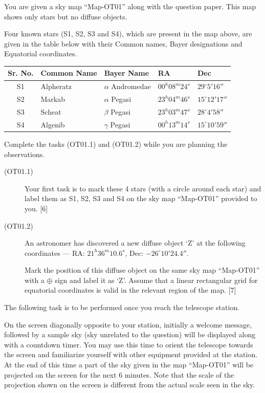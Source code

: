 You are given a sky map ``Map-OT01'' along with the question paper. This map
shows only stars but no diffuse objects.


Four known stars (S1, S2, S3 and S4), which are present in the map above,
are given in the table below with their Common names, Bayer designations and
Equatorial coordinates.

\begin{center}
\begin{tabular}{cllll}
Sr. No. & Common Name & Bayer Name & RA & Dec \\
\hline
S1 & Alpheratz & $\alpha$ Andromedae & $00^h08^m24^s$ & $29^\circ 5'16''$ \\
S2 & Markab & $\alpha$ Pegasi & $23^h04^m46^s$ & $15^\circ 12'17''$ \\
S3 & Scheat & $\beta$ Pegasi & $23^h03^m47^s$ & $28^\circ 4'58''$ \\
S4 & Algenib & $\gamma$ Pegasi & $00^h13^m14^s$ & $15^\circ 10'59''$ \\
\end{tabular}
\end{center}

Complete the tasks (OT01.1) and (OT01.2) while you are planning the
observations.

\begin{description}
\item[(OT01.1)] Your first task is to mark these 4 stars (with a circle
  around each star) and label them as S1, S2, S3 and S4 on the sky map
  ``Map-OT01'' provided to you. \hfill[6]
\item[(OT01.2)] An astronomer has discovered a new diffuse object `Z' at the
  following coordinates ---
  RA: $21^h36^m10.6^s$, Dec: $-26^\circ 10'24.4''$.

  Mark the position of this diffuse object on the same sky map ``Map-OT01''
  with a $\oplus$ sign and label it as `Z'. Assume that a linear rectangular
  grid for equatorial coordinates is valid in the relevant region of the
  map. \hfill[7]
\end{description}

The following task is to be performed once you reach the telescope station.

On the screen diagonally opposite to your station, initially a welcome
message, followed by a sample sky (sky unrelated to the question) will be
displayed along with a countdown timer. You may use this time to orient the
telescope towards the screen and familiarize yourself with other equipment
provided at the station. At the end of this time a part of the sky given in
the map ``Map-OT01'' will be projected on the screen for the next 6 minutes.
Note that the scale of the projection shown on the screen is different from
the actual scale seen in the sky.

